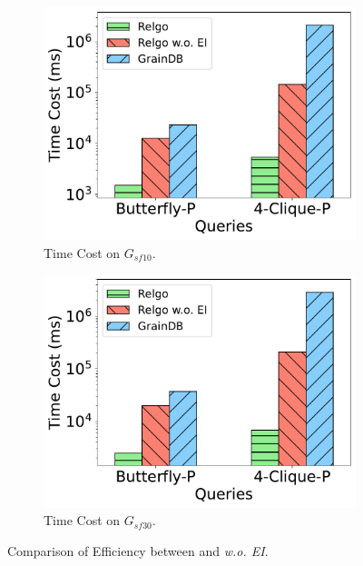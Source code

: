 \begin{figure}[ht]
    \centering
    \begin{subfigure}[b]{.45\linewidth}
        \centering
        \includegraphics[width=\linewidth]{./figures/exp/ablation_ei_para_sf10.pdf}
        \caption{Time Cost on $G_{sf10}$.}
        \label{fig:exp-expand-intersect-sf10}
    \end{subfigure}
    \begin{subfigure}[b]{0.45\linewidth}
        \centering
        \includegraphics[width=\linewidth]{./figures/exp/ablation_ei_para_sf30.pdf}
        \caption{Time Cost on $G_{sf30}$.}
        \label{fig:exp-expand-intersect-sf30}
    \end{subfigure}
    \caption{Comparison of Efficiency between \relgo and \textit{\relgo w.o. EI}.}
    \label{fig:exp-expand-intersect}
\end{figure}

